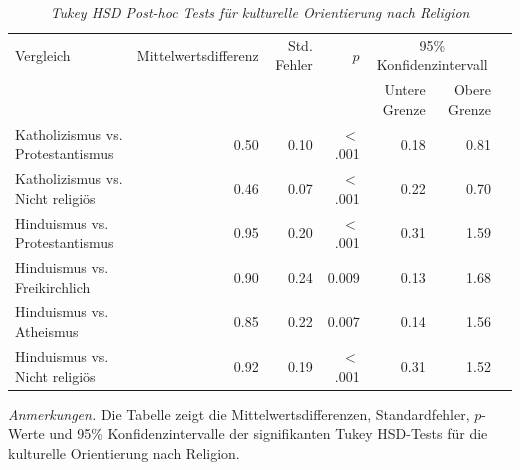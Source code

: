\begin{table}[htb]
  \caption[Tukey HSD Post-hoc Tests für kulturelle Orientierung nach Religion]{\textit{Tukey HSD Post-hoc Tests für kulturelle Orientierung nach Religion}}
  \label{PostHocTests}
  \centering
  \begin{adjustbox}{width=\textwidth}
  \small
  \begin{threeparttable}
      \begin{tabular}{lrrrrrr}
          \toprule
          Vergleich & Mittelwertsdifferenz & Std. Fehler & $p$ & \multicolumn{2}{c}{95\% Konfidenzintervall} \\
          \cmidrule(r){5-6}
          & & & & Untere Grenze & Obere Grenze \\
          \midrule
          Katholizismus vs. Protestantismus & 0.50 & 0.10 & $<$.001 & 0.18 & 0.81 \\
          Katholizismus vs. Nicht religiös & 0.46 & 0.07 & $<$.001 & 0.22 & 0.70 \\
          Hinduismus vs. Protestantismus & 0.95 & 0.20 & $<$.001 & 0.31 & 1.59 \\
          Hinduismus vs. Freikirchlich & 0.90 & 0.24 & 0.009 & 0.13 & 1.68 \\
          Hinduismus vs. Atheismus & 0.85 & 0.22 & 0.007 & 0.14 & 1.56 \\
          Hinduismus vs. Nicht religiös & 0.92 & 0.19 & $<$.001 & 0.31 & 1.52 \\
          \bottomrule
      \end{tabular}
      \begin{tablenotes}
          \small
          \item \textit{Anmerkungen.} Die Tabelle zeigt die Mittelwertsdifferenzen, Standardfehler, $p$-Werte und 95\% Konfidenzintervalle der signifikanten Tukey HSD-Tests für die kulturelle Orientierung nach Religion. \\
      \end{tablenotes}
  \end{threeparttable}
  \end{adjustbox}
\end{table}

